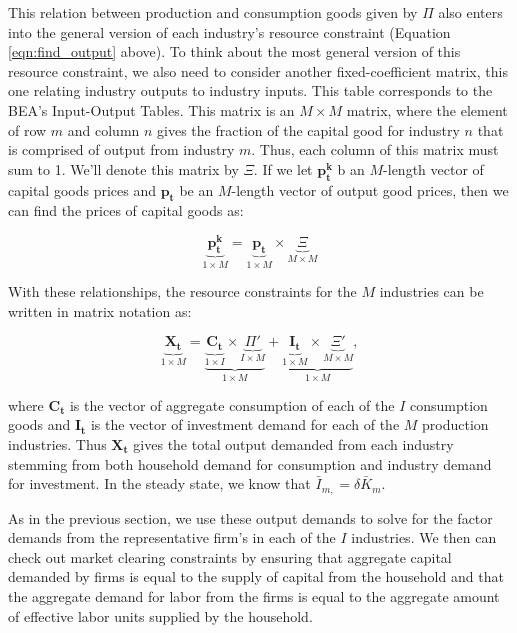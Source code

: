 \documentclass[letterpaper,12pt]{article}
\theoremstyle{definition}
\begin{document}
\begin{spacing}{1.5}
This relation between production and consumption goods given by $\Pi$ also enters into the general version of each industry's resource constraint (Equation \ref{eqn:find_output} above).   To think about the most general version of this resource constraint, we also need to consider another fixed-coefficient matrix, this one relating industry outputs to industry inputs.  This table corresponds to the BEA's Input-Output Tables.  This matrix is an $M\times M$ matrix, where the element of row $m$ and column $n$ gives the fraction of the capital good for industry $n$ that is comprised of output from industry $m$.  Thus, each column of this matrix must sum to 1.   We'll denote this matrix by $\Xi$.  If we let $\boldsymbol{p^{k}_{t}}$ b an $M$-length vector of capital goods prices and $\boldsymbol{p_{t}}$ be an $M$-length vector of output good prices, then we can find the prices of capital goods as:

\begin{equation}
\label{eqn:capital_prices}
\underbrace{\boldsymbol{p^{k}_{t}}}_{1\times M} =\underbrace{\boldsymbol{p_{t}}}_{1\times M} \times  \underbrace{\Xi}_{M\times M}
\end{equation}

With these relationships, the resource constraints for the $M$ industries can be written in matrix notation as:

\begin{equation}
\label{eqn:matrix_rc}
\underbrace{\boldsymbol{X_{t}}}_{1\times M} = \underbrace{\underbrace{\boldsymbol{C_{t}}}_{1\times I} \times  \underbrace{\Pi'}_{I\times M}}_{1\times M} + \underbrace{\underbrace{\boldsymbol{I_{t}}}_{1\times M} \times  \underbrace{\Xi'}_{M\times M}}_{1\times M}, 
\end{equation}

\noindent\noindent where $\boldsymbol{C_{t}}$ is the vector of aggregate consumption of each of the $I$ consumption goods and $\boldsymbol{I_{t}}$ is the vector of investment demand for each of the $M$ production industries.  Thus $\boldsymbol{X_{t}}$ gives the total output demanded from each industry stemming from both household demand for consumption and industry demand for investment.  In the steady state, we know that $\bar{I}_{m,}=\delta \bar{K}_{m}$.  

As in the previous section, we use these output demands to solve for the factor demands from the representative firm's in each of the $I$ industries.  We then can check out market clearing constraints by ensuring that aggregate capital demanded by firms is equal to the supply of capital from the household and that the aggregate demand for labor from the firms is equal to the aggregate amount of effective labor units supplied by the household.


\end{spacing}
\end{document}
